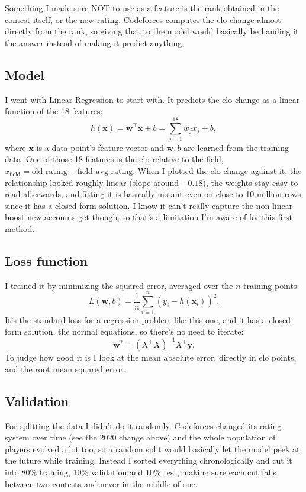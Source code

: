 \documentclass[11pt,a4paper]{article}
\begin{document}
Something I made sure NOT to use as a feature is the rank obtained in the contest itself, or the new rating. Codeforces computes the elo change almost directly from the rank, so giving that to the model would basically be handing it the answer instead of making it predict anything.

\subsection*{Model}

I went with Linear Regression to start with. It predicts the elo change as a linear function of the 18 features:
\[
h(\mathbf{x}) = \mathbf{w}^\top \mathbf{x} + b = \sum_{j=1}^{18} w_j x_j + b,
\]
where $\mathbf{x}$ is a data point's feature vector and $\mathbf{w}, b$ are learned from the training data. One of those 18 features is the elo relative to the field, $x_{\text{field}} = \text{old\_rating} - \text{field\_avg\_rating}$. When I plotted the elo change against it, the relationship looked roughly linear (slope around $-0.18$), the weights stay easy to read afterwards, and fitting it is basically instant even on close to 10 million rows since it has a closed-form solution. I know it can't really capture the non-linear boost new accounts get though, so that's a limitation I'm aware of for this first method.

\subsection*{Loss function}

I trained it by minimizing the squared error, averaged over the $n$ training points:
\[
L(\mathbf{w}, b) = \frac{1}{n}\sum_{i=1}^{n} \left(y_i - h(\mathbf{x}_i)\right)^2.
\]
It's the standard loss for a regression problem like this one, and it has a closed-form solution, the normal equations, so there's no need to iterate:
\[
\mathbf{w}^* = (X^\top X)^{-1} X^\top \mathbf{y}.
\]
To judge how good it is I look at the mean absolute error, directly in elo points, and the root mean squared error.

\subsection*{Validation}

For splitting the data I didn't do it randomly. Codeforces changed its rating system over time (see the 2020 change above) and the whole population of players evolved a lot too, so a random split would basically let the model peek at the future while training. Instead I sorted everything chronologically and cut it into 80\% training, 10\% validation and 10\% test, making sure each cut falls between two contests and never in the middle of one.
\end{document}
